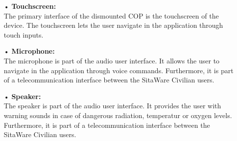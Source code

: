 \begin{enumerate}
\item[•] \textbf{Touchscreen:} \\
The primary interface of the dismounted COP is the touchscreen of the device. The touchscreen lets the user navigate in the application through touch inputs. 

\item[•] \textbf{Microphone:} \\
The microphone is part of the audio user interface. It allows the user to navigate in the application through voice commands. Furthermore, it is part of a telecommunication interface between the SitaWare Civilian users. 

\item[•] \textbf{Speaker:} \\
The speaker is part of the audio user interface. It provides the user with warning sounds in case of dangerous radiation, temperatur or oxygen levels. Furthermore, it is part of a telecommunication interface between the SitaWare Civilian users.
\end{enumerate}